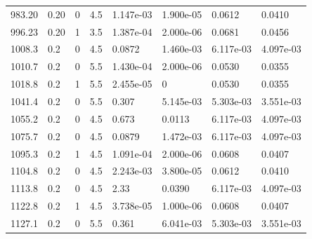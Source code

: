 \documentclass[preview]{standalone}
\begin{document}
{{{\begin{tabular}{L{1.2cm}C{1.2cm} C{0.3cm}C{0.5cm} C{1.4cm}C{1.4cm} C{1.4cm}C{1.4cm}}
  983.20  &  0.20  & 0     & 4.5 &  1.147e-03  & 1.900e-05  & 0.0612 &  0.0410   \\ 
  996.23  &  0.20  & 1     & 3.5 &  1.387e-04  & 2.000e-06  & 0.0681 &  0.0456   \\ 
  1008.3  &   0.2  & 0     & 4.5 &  0.0872  & 1.460e-03  & 6.117e-03 &  4.097e-03   \\ 
  1010.7  &   0.2  & 0     & 5.5 &  1.430e-04  & 2.000e-06  & 0.0530 &  0.0355   \\ 
  1018.8  &   0.2  & 1     & 5.5 &  2.455e-05  & 0  & 0.0530 &  0.0355   \\ 
  1041.4  &   0.2  & 0     & 5.5 &  0.307  & 5.145e-03  & 5.303e-03 &  3.551e-03   \\ 
  1055.2  &   0.2  & 0     & 4.5 &  0.673  & 0.0113  & 6.117e-03 &  4.097e-03   \\ 
  1075.7  &   0.2  & 0     & 4.5 &  0.0879  & 1.472e-03  & 6.117e-03 &  4.097e-03   \\ 
  1095.3  &   0.2  & 1     & 4.5 &  1.091e-04  & 2.000e-06  & 0.0608 &  0.0407   \\ 
  1104.8  &   0.2  & 0     & 4.5 &  2.243e-03  & 3.800e-05  & 0.0612 &  0.0410   \\ 
  1113.8  &   0.2  & 0     & 4.5 &  2.33  & 0.0390  & 6.117e-03 &  4.097e-03   \\ 
  1122.8  &   0.2  & 1     & 4.5 &  3.738e-05  & 1.000e-06  & 0.0608 &  0.0407   \\ 
  1127.1  &   0.2  & 0     & 5.5 &  0.361  & 6.041e-03  & 5.303e-03 &  3.551e-03   \\ 
\hline 
\end{tabular} 

}}}
\end{document}
